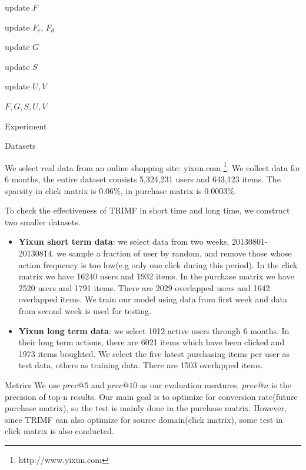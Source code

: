 \begin{section}
\begin{algorithm}[tb]
\begin{algorithmic}

\STATE update $F$

\STATE update $F_c$, $F_d$

\STATE  update $G$

\STATE  update $S$

\STATE  update $U, V$


\ENDFOR

 $F,G,S,U,V$

\end{algorithmic}
\label{algorithm:TRIMF}
\end{algorithm}

\end{section}
\begin{section}{Experiment}
  \begin{subsection}{Datasets}

We select real data from an online shopping site: yixun.com \footnote{http://www.yixun.com}. We collect data for 6 months, the entire dataset consists 5,324,231 users and 643,123 items. The sparsity in click matrix is $0.06\%$, in purchase matrix is $0.0003\%$.

To check the effectiveness of TRIMF in short time and long time, we construct two smaller datasets.

\begin{itemize}

\item \textbf{Yixun short term data}: we select data from two weeks, 20130801-20130814. we sample a fraction of user by random, and remove those whose action frequency is too low(e.g only one click during this period). In the click matrix we have 16240 users and 1932 items. In the purchase matrix we have 2520 users and 1791 items. There are 2029 overlapped users and 1642 overlapped items. We train our model using data from first week and data from second week is used for testing.
\item \textbf{Yixun long term data}: we select 1012 active users through 6 months. In their long term actions, there are 6021 items which have been clicked and 1973 items boughted. We select the five latest purchasing items per user as test data, others as training data. There are 1503 overlapped items.

\end{itemize}
\end{subsection}

\begin{subsection}{Metrics}
We use $prec@5$ and $prec@10$ as our evaluation meatures. $prec@n$ is the precision of top-n results. Our main goal is to optimize for conversion rate(future purchase matrix), so the test is mainly done in the purchase matrix. However, since TRIMF can also optimize for source domain(click matrix), some test in click matrix is also conducted.


\end{subsection}
\end{section}
